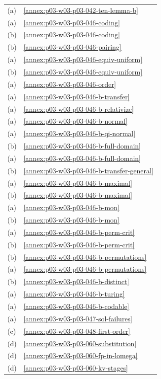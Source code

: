 \begin{longtable}{@{}p{}p{}@{}}
(a) & \cref{annex:p03-w03-p03-042-ten-lemma-b} \\
(a) & \cref{annex:p03-w03-p03-046-coding} \\
(b) & \cref{annex:p03-w03-p03-046-coding} \\
(b) & \cref{annex:p03-w03-p03-046-pairing} \\
(a) & \cref{annex:p03-w03-p03-046-equiv-uniform} \\
(b) & \cref{annex:p03-w03-p03-046-equiv-uniform} \\
(a) & \cref{annex:p03-w03-p03-046-order} \\
(a) & \cref{annex:p03-w03-p03-046-b-transfer} \\
(a) & \cref{annex:p03-w03-p03-046-b-relativize} \\
(a) & \cref{annex:p03-w03-p03-046-b-normal} \\
(a) & \cref{annex:p03-w03-p03-046-b-qi-normal} \\
(b) & \cref{annex:p03-w03-p03-046-b-full-domain} \\
(a) & \cref{annex:p03-w03-p03-046-b-full-domain} \\
(b) & \cref{annex:p03-w03-p03-046-b-transfer-general} \\
(a) & \cref{annex:p03-w03-p03-046-b-maximal} \\
(b) & \cref{annex:p03-w03-p03-046-b-maximal} \\
(a) & \cref{annex:p03-w03-p03-046-b-mon} \\
(b) & \cref{annex:p03-w03-p03-046-b-mon} \\
(a) & \cref{annex:p03-w03-p03-046-b-perm-crit} \\
(b) & \cref{annex:p03-w03-p03-046-b-perm-crit} \\
(b) & \cref{annex:p03-w03-p03-046-b-permutations} \\
(a) & \cref{annex:p03-w03-p03-046-b-permutations} \\
(b) & \cref{annex:p03-w03-p03-046-b-distinct} \\
(a) & \cref{annex:p03-w03-p03-046-b-turing} \\
(a) & \cref{annex:p03-w03-p03-046-b-codable} \\
(a) & \cref{annex:p03-w03-p03-047-sol-failures} \\
(c) & \cref{annex:p03-w03-p03-048-first-order} \\
(d) & \cref{annex:p03-w03-p03-060-substitution} \\
(d) & \cref{annex:p03-w03-p03-060-fp-in-lomega} \\
(d) & \cref{annex:p03-w03-p03-060-kv-stages} \\

\end{longtable}
